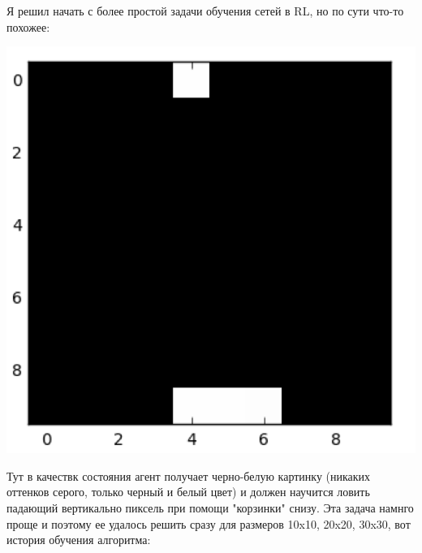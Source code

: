\documentclass[a4paper]{article}
\begin{document}
Я решил начать с более простой задачи обучения сетей в RL, но по сути что-то похожее:
\begin{center}
\includegraphics[scale=0.5]{myGame}
\end{center} 
Тут в качествк состояния агент получает черно-белую картинку (никаких оттенков серого, только черный и белый цвет) и должен научится ловить падающий вертикально пиксель при помощи "корзинки" снизу. 
Эта задача намнго проще и поэтому ее удалось решить сразу для размеров 10x10, 20x20, 30x30, вот история обучения алгоритма:
\end{document}
